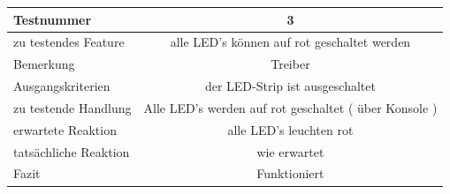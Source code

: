 \documentclass[]{article}
\begin{document}
\begin{longtable}[]{@{}lc@{}}
\toprule
\begin{minipage}[b]{0.25\columnwidth}\raggedright\strut
Testnummer\strut
\end{minipage} & \begin{minipage}[b]{0.55\columnwidth}\centering\strut
3\strut
\end{minipage}\tabularnewline
\midrule
\endhead
\begin{minipage}[t]{0.25\columnwidth}\raggedright\strut
zu testendes Feature\strut
\end{minipage} & \begin{minipage}[t]{0.55\columnwidth}\centering\strut
alle LED's können auf rot geschaltet werden\strut
\end{minipage}\tabularnewline
\begin{minipage}[t]{0.25\columnwidth}\raggedright\strut
Bemerkung\strut
\end{minipage} & \begin{minipage}[t]{0.55\columnwidth}\centering\strut
Treiber\strut
\end{minipage}\tabularnewline
\begin{minipage}[t]{0.25\columnwidth}\raggedright\strut
Ausgangskriterien\strut
\end{minipage} & \begin{minipage}[t]{0.55\columnwidth}\centering\strut
der LED-Strip ist ausgeschaltet\strut
\end{minipage}\tabularnewline
\begin{minipage}[t]{0.25\columnwidth}\raggedright\strut
zu testende Handlung\strut
\end{minipage} & \begin{minipage}[t]{0.55\columnwidth}\centering\strut
Alle LED's werden auf rot geschaltet ( über Konsole )\strut
\end{minipage}\tabularnewline
\begin{minipage}[t]{0.25\columnwidth}\raggedright\strut
erwartete Reaktion\strut
\end{minipage} & \begin{minipage}[t]{0.55\columnwidth}\centering\strut
alle LED's leuchten rot\strut
\end{minipage}\tabularnewline
\begin{minipage}[t]{0.25\columnwidth}\raggedright\strut
tatsächliche Reaktion\strut
\end{minipage} & \begin{minipage}[t]{0.55\columnwidth}\centering\strut
wie erwartet\strut
\end{minipage}\tabularnewline
\begin{minipage}[t]{0.25\columnwidth}\raggedright\strut
Fazit\strut
\end{minipage} & \begin{minipage}[t]{0.55\columnwidth}\centering\strut
Funktioniert\strut
\end{minipage}\tabularnewline
\bottomrule
\end{longtable}
\end{document}
